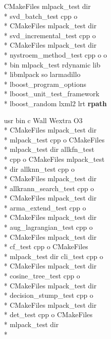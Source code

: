 \begin{DoxyCompactItemize}
C\-Make\-Files mlpack\-\_\-test dir \\*
svd\-\_\-batch\-\_\-test cpp o \\*
C\-Make\-Files mlpack\-\_\-test dir \\*
svd\-\_\-incremental\-\_\-test cpp o \\*
C\-Make\-Files mlpack\-\_\-test dir \\*
nystroem\-\_\-method\-\_\-test cpp o o \\*
bin mlpack\-\_\-test rdynamic lib \\*
libmlpack so larmadillo \\*
lboost\-\_\-program\-\_\-options \\*
lboost\-\_\-unit\-\_\-test\-\_\-framework \\*
lboost\-\_\-random lxml2 lrt {\bf rpath}
\item 
usr bin c Wall Wextra O3 \\*
C\-Make\-Files mlpack\-\_\-test dir \\*
mlpack\-\_\-test cpp o C\-Make\-Files \\*
mlpack\-\_\-test dir allkfn\-\_\-test \\*
cpp o C\-Make\-Files mlpack\-\_\-test \\*
dir allknn\-\_\-test cpp o \\*
C\-Make\-Files mlpack\-\_\-test dir \\*
allkrann\-\_\-search\-\_\-test cpp o \\*
C\-Make\-Files mlpack\-\_\-test dir \\*
arma\-\_\-extend\-\_\-test cpp o \\*
C\-Make\-Files mlpack\-\_\-test dir \\*
aug\-\_\-lagrangian\-\_\-test cpp o \\*
C\-Make\-Files mlpack\-\_\-test dir \\*
cf\-\_\-test cpp o C\-Make\-Files \\*
mlpack\-\_\-test dir cli\-\_\-test cpp o \\*
C\-Make\-Files mlpack\-\_\-test dir \\*
cosine\-\_\-tree\-\_\-test cpp o \\*
C\-Make\-Files mlpack\-\_\-test dir \\*
decision\-\_\-stump\-\_\-test cpp o \\*
C\-Make\-Files mlpack\-\_\-test dir \\*
det\-\_\-test cpp o C\-Make\-Files \\*
mlpack\-\_\-test dir \\*

\end{DoxyCompactItemize}

